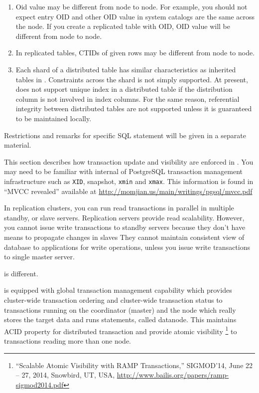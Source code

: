   \begin{enumerate}
	  \item Oid value may be different from node to node.
		    For example, you should not expect  entry OID and other OID value
			in system catalogs are the same across the node.
			If you create a replicated table with OID, OID value will be different from node to node.
  
	  \item In replicated tables, CTIDs of given rows may be different from node to node.
  
	  \item Each shard of a distributed table has similar characteristics as inherited tables in \PG.
	  		Constraints across the shard is not simply supported.
			At present, \XC{} does not support unique index in a distributed table
			if the distribution column is not involved in index columns.
			For the same reason, referential integrity between distributed tables
			are not supported unless it is guaranteed to be maintained locally.
  \end{enumerate}
  
  Restrictions and remarks for specific SQL statement will be given in a separate material.




  This section describes how transaction update and visibility are enforced in \XC.
  You may need to be familiar with internal of PostgreSQL transaction management
  infrastructure such as \texttt{XID}, snapshot, \texttt{xmin} and \texttt{xmax}.
  This information is found in ``MVCC revealed'' available at
  \url{http://momjian.us/main/writings/pgsql/mvcc.pdf}
  
  In replication clusters, you can run read transactions in parallel in multiple standby,
  or slave servers.
  Replication servers provide read scalability.
  However, you cannot issue write transactions to standby servers
  because they don't have means to propagate changes in slaves
  They cannot maintain consistent view of database to applications for write operations,
  unless you issue write transactions to single master server.
  
  \XC{} is different.
  
  \XC{} is equipped with global transaction management capability which provides
  cluster-wide transaction ordering and cluster-wide transaction status to transactions
  running on the coordinator (master) and the node which really stores the target data
  and runs statements, called datanode.
  This maintains ACID property for distributed transaction and provide atomic visibility%
  \footnote{
	  ``Scalable Atomic Visibility with RAMP Transactions,''
	  SIGMOD'14, June 22 -- 27, 2014, Snowbird, UT, USA,
	  \url{http://www.bailis.org/papers/ramp-sigmod2014.pdf}
  }
  to transactions reading more than one node.
  
